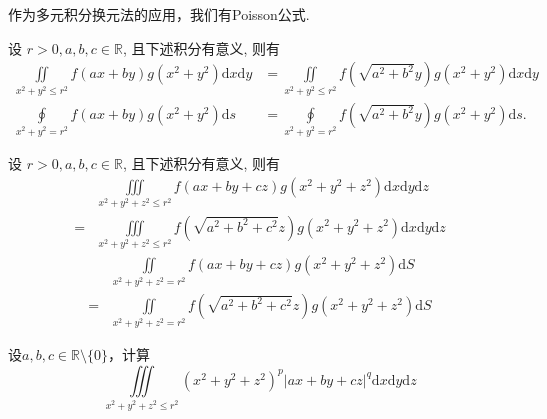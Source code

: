 作为多元积分换元法的应用，我们有Poisson公式.

\begin{theorem}[二元函数Poisson公式]
    设 $r>0, a, b, c \in \mathbb{R}$, 且下述积分有意义, 则有
{\small
\begin{align}
    \iint\limits_{x^2+y^2 \leqslant r^2} f(a x+b y) g\left(x^2+y^2\right) \mathrm{d} x \mathrm{d} y & =\iint\limits_{x^2+y^2 \leqslant r^2} f\left(\sqrt{a^2+b^2} y\right) g\left(x^2+y^2\right) \mathrm{d} x \mathrm{d} y \\
    \oint\limits_{x^2+y^2=r^2} f(a x+b y) g\left(x^2+y^2\right) \mathrm{d} s & =\oint\limits_{x^2+y^2=r^2} f\left(\sqrt{a^2+b^2} y\right) g\left(x^2+y^2\right) \mathrm{d} s .
\end{align}
}
\end{theorem}

\begin{theorem}[三元函数Poisson公式]
    设 $r>0, a, b, c \in \mathbb{R}$, 且下述积分有意义, 则有
{\small 
\begin{equation}
    \begin{split}
        & \iiint\limits_{x^2+y^2+z^2 \leqslant r^2}  f(a x+b y+c z) g\left(x^2+y^2+z^2\right) \mathrm{d} x \mathrm{d} y \mathrm{d} z \\
        = & \iiint\limits_{x^2+y^2+z^2 \leqslant r^2} f\left(\sqrt{a^2+b^2+c^2} z\right) g\left(x^2+y^2+z^2\right) \mathrm{d} x \mathrm{d} y \mathrm{d} z 
    \end{split}
\end{equation}
\begin{equation}
    \begin{split}
        & \iint\limits_{x^2+y^2+z^2=r^2}  f(a x+b y+c z) g\left(x^2+y^2+z^2\right) \mathrm{d} S \\
        = & \iint\limits_{x^2+y^2+z^2=r^2} f\left(\sqrt{a^2+b^2+c^2} z\right) g\left(x^2+y^2+z^2\right) \mathrm{d} S
    \end{split}
\end{equation}
}   
\end{theorem}

\begin{exercise}
    设$a,b,c\in\mathbb{R}\setminus\{0\}$，计算
    \[
        \iiint\limits_{x^2+y^2+z^2\leq r^2} (x^2+y^2+z^2)^p\left|ax+by+cz\right|^q\mathrm{d}x\mathrm{d}y\mathrm{d}z
    \]
\end{exercise}

